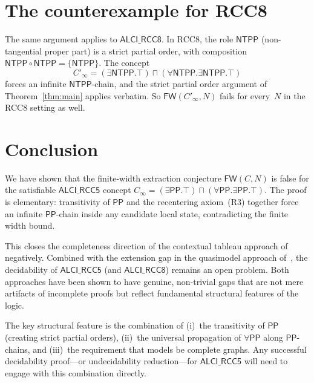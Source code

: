 \documentclass[11pt]{article}
\theoremstyle{definition}
\newcommand{\ALCIRCC}{\mathsf{ALCI\_RCC5}}
\newcommand{\Pp}{\mathsf{PP}}
\begin{document}
\section{The counterexample for RCC8}\label{sec:rcc8}

The same argument applies to $\mathsf{ALCI\_RCC8}$.  In RCC8, the
role $\mathsf{NTPP}$ (non-tangential proper part) is a strict partial
order, with composition
$\mathsf{NTPP}\circ\mathsf{NTPP}=\{\mathsf{NTPP}\}$.  The concept
\[
C'_\infty = (\exists\mathsf{NTPP}.\top)
  \sqcap(\forall\mathsf{NTPP}.\exists\mathsf{NTPP}.\top)
\]
forces an infinite $\mathsf{NTPP}$-chain, and the strict partial order
argument of Theorem~\ref{thm:main} applies verbatim.  So
$\mathsf{FW}(C'_\infty,N)$ fails for every~$N$ in the RCC8 setting as
well.

\section{Conclusion}

We have shown that the finite-width extraction conjecture
$\mathsf{FW}(C,N)$ is false for the satisfiable $\ALCIRCC$ concept
$C_\infty=(\exists\Pp.\top)\sqcap(\forall\Pp.\exists\Pp.\top)$.  The
proof is elementary: transitivity of $\Pp$ and the recentering
axiom~(R3) together force an infinite $\Pp$-chain inside any
candidate local state, contradicting the finite width bound.

This closes the completeness direction of the contextual tableau
approach of~\cite{GPT2026} negatively.  Combined with the extension
gap in the quasimodel approach of~\cite{Claude2026}, the decidability
of $\ALCIRCC$ (and $\mathsf{ALCI\_RCC8}$) remains an open problem.
Both approaches have been shown to have genuine, non-trivial gaps that
are not mere artifacts of incomplete proofs but reflect fundamental
structural features of the logic.

The key structural feature is the combination of (i)~the transitivity
of $\Pp$ (creating strict partial orders), (ii)~the universal
propagation of $\forall\Pp$ along $\Pp$-chains, and (iii)~the
requirement that models be complete graphs.  Any successful
decidability proof---or undecidability reduction---for $\ALCIRCC$ will
need to engage with this combination directly.
\end{document}
